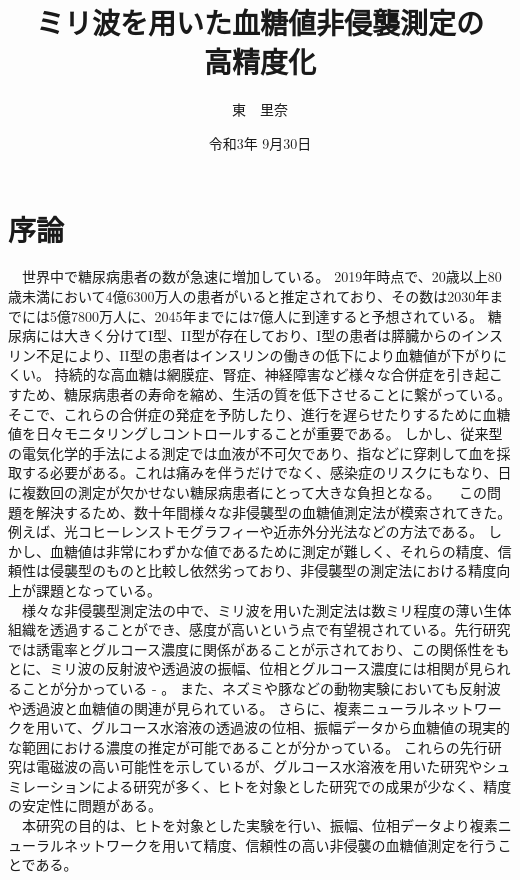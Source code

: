 \documentclass[11pt,a4paper,uplatex,draft]{ujarticle}
\title{ミリ波を用いた血糖値非侵襲測定の\\高精度化}
\date{令和3年 9月30日}
\author{東　里奈}
\begin{document}
\maketitle
\newpage
\tableofcontents
\newpage
\section{序論}
　世界中で糖尿病患者の数が急速に増加している。
2019年時点で、20歳以上80歳未満において4億6300万人の患者がいると推定されており、その数は2030年までには5億7800万人に、2045年までには7億人に到達すると予想されている。
糖尿病には大きく分けてI型、I\hspace{-.1em}I型が存在しており、I型の患者は膵臓からのインスリン不足により、I\hspace{-.1em}I型の患者はインスリンの働きの低下により血糖値が下がりにくい。
持続的な高血糖は網膜症、腎症、神経障害など様々な合併症を引き起こすため、糖尿病患者の寿命を縮め、生活の質を低下させることに繋がっている。そこで、これらの合併症の発症を予防したり、進行を遅らせたりするために血糖値を日々モニタリングしコントロールすることが重要である\cite{idf}。
しかし、従来型の電気化学的手法による測定では血液が不可欠であり、指などに穿刺して血を採取する必要がある。これは痛みを伴うだけでなく、感染症のリスクにもなり、日に複数回の測定が欠かせない糖尿病患者にとって大きな負担となる。
　この問題を解決するため、数十年間様々な非侵襲型の血糖値測定法が模索されてきた。例えば、光コヒーレンストモグラフィーや近赤外分光法などの方法である。 しかし、血糖値は非常にわずかな値であるために測定が難しく、それらの精度、信頼性は侵襲型のものと比較し依然劣っており、非侵襲型の測定法における精度向上が課題となっている\cite{review}。\\
　様々な非侵襲型測定法の中で、ミリ波を用いた測定法は数ミリ程度の薄い生体組織を透過することができ、感度が高いという点で有望視されている。先行研究では誘電率とグルコース濃度に関係があることが示されており、この関係性をもとに、ミリ波の反射波や透過波の振幅、位相とグルコース濃度には相関が見られることが分かっている\cite{Nikawa} - \cite{OMER}。 
また、ネズミや豚などの動物実験においても反射波や透過波と血糖値の関連が見られている\cite{pig}。
さらに、複素ニューラルネットワークを用いて、グルコース水溶液の透過波の位相、振幅データから血糖値の現実的な範囲における濃度の推定が可能であることが分かっている\cite{Husan}。
これらの先行研究は電磁波の高い可能性を示しているが、グルコース水溶液を用いた研究やシュミレーションによる研究が多く、ヒトを対象とした研究での成果が少なく、精度の安定性に問題がある。\\
　本研究の目的は、ヒトを対象とした実験を行い、振幅、位相データより複素ニューラルネットワークを用いて精度、信頼性の高い非侵襲の血糖値測定を行うことである。
\end{document}
